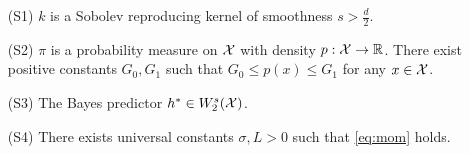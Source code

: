 \begin{enumerate}[leftmargin=1.0cm]
    \item [(S1)] $k$ is a Sobolev reproducing kernel of smoothness $s > \frac{d}{2}$.
    \item [(S2)] $\pi$ is a probability measure on $\mathcal{X}$ with density $p: \mathcal{X} \to \mathbb{R}$. There exist positive constants $G_0, G_1$ such that $G_0 \leq p(x) \leq G_1$ for any $x \in \mathcal{X}$. 
    \item [(S3)] The Bayes predictor $h^\ast \in W_2^s(\mathcal{X})$.
    \item [(S4)] There exists universal constants $\sigma, L > 0$ such that \eqref{eq:mom} holds. 
\end{enumerate}

